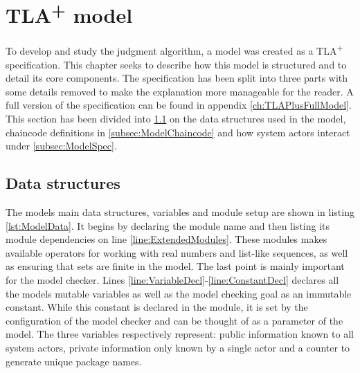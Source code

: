 \chapter{TLA\textsuperscript+ model}

To develop and study the judgment algorithm, a model was created as a TLA\textsuperscript+ specification. This chapter seeks to describe how this model is structured and to detail its core components. The specification has been split into three parts with some details removed to make the explanation more manageable for the reader. A full version of the specification can be found in appendix \ref{ch:TLAPlusFullModel}. This section has been divided into \ref{subsec:ModelData} on the data structures used in the model, chaincode definitions in \ref{subsec:ModelChaincode} and how system actors interact under \ref{subsec:ModelSpec}.

\lstset{
    escapechar=µ
    , numbers=left
    , firstnumber=auto}

\section{Data structures}
\label{subsec:ModelData}

The models main data structures, variables and module setup are shown in listing \ref{lst:ModelData}. It begins by declaring the module name and then listing its module dependencies on line \ref{line:ExtendedModules}. These modules makes available operators for working with real numbers and list-like sequences, as well as ensuring that sets are finite in the model. The last point is mainly important for the model checker. Lines \ref{line:VariableDecl}-\ref{line:ConstantDecl} declares all the models mutable variables as well as the model checking goal as an immutable constant. While this constant is declared in the module, it is set by the configuration of the model checker and can be thought of as a parameter of the model. The three variables respectively represent: public information known to all system actors, private information only known by a single actor and a counter to generate unique package names.

